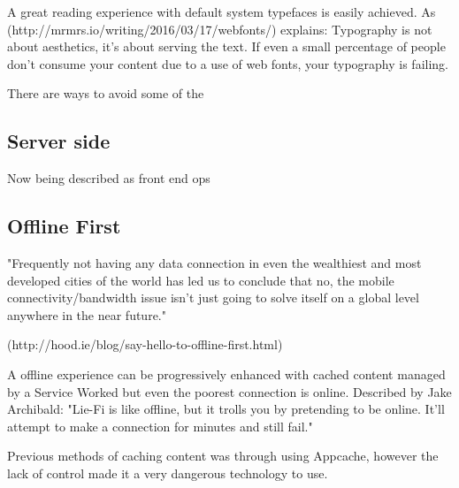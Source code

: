 A great reading experience with default system typefaces is easily achieved. As (http://mrmrs.io/writing/2016/03/17/webfonts/) explains: Typography is not about aesthetics, it's about serving the text. If even a small percentage of people don't consume your content due to a use of web fonts, your typography is failing.

There are ways to avoid some of the %

\subsection{Server side}

Now being described as front end ops






\subsection{Offline First}

"Frequently not having any data connection in even the wealthiest and most developed cities of the world has led us to conclude that no, the mobile connectivity/bandwidth issue isn’t just going to solve itself on a global level anywhere in the near future."

(http://hood.ie/blog/say-hello-to-offline-first.html)


A offline experience can be progressively enhanced with cached content managed by a Service Worked but even the poorest connection is online.
Described by Jake Archibald: "Lie-Fi is like offline, but it trolls you by pretending to be online. It'll attempt to make a connection for minutes and still fail."

Previous methods of caching content was through using Appcache, however the lack of control made it a very dangerous technology to use. %

